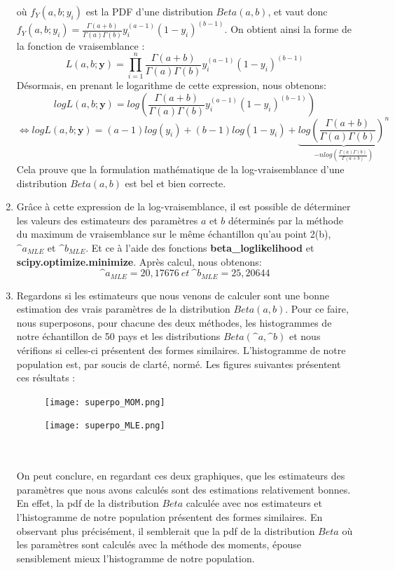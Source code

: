 \documentclass[a4paper, 11pt]{article}
\begin{document}
\begin{enumerate}[label=(\alph*)]
    où $f_Y(a,b;y_i)$ est la PDF d'une distribution $Beta(a,b)$, et vaut donc $f_Y(a,b;y_i)=\frac{\Gamma(a+b)}{\Gamma(a) \Gamma(b)} y_i^{(a-1)} (1-y_i)^{(b-1)}$.
    On obtient ainsi la forme de la fonction de vraisemblance :
    $$L(a,b;\textbf{y})=\prod^n_{i=1} \frac{\Gamma(a+b)}{\Gamma(a) \Gamma(b)} y_i^{(a-1)} (1-y_i)^{(b-1)}$$
    Désormais, en prenant le logarithme de cette expression, nous obtenons:
    $$log L(a,b;\textbf{y})=log\left(\frac{\Gamma(a+b)}{\Gamma(a) \Gamma(b)} y_i^{(a-1)} (1-y_i)^{(b-1)}\right)$$
    $$\Longleftrightarrow log L(a,b;\textbf{y})=(a-1)log(y_i)+(b-1) log(1-y_i)+\underbrace{log\left(\frac{\Gamma(a+b)}{\Gamma(a) \Gamma(b)}\right)^n}_{-nlog\left(\frac{\Gamma(a) \Gamma(b)}{\Gamma (a+b)}\right)}$$
    Cela prouve que la formulation mathématique de la log-vraisemblance d'une distribution $Beta(a,b)$ est bel et bien correcte.
    \item Grâce à cette expression de la log-vraisemblance, il est possible de déterminer les valeurs des estimateurs des paramètres $a$ et $b$ déterminés par la méthode du maximum de vraisemblance sur le même échantillon qu'au point 2(b), $\^a_{MLE}$ et $\^b_{MLE}$. Et ce à l'aide des fonctions \textbf{beta\_loglikelihood} et \textbf{scipy.optimize.minimize}. Après calcul, nous obtenons:
    $$\^a_{MLE}=20,17676~et~\^b_{MLE}=25,20644$$
    \item Regardons si les estimateurs que nous venons de calculer sont une bonne estimation des vrais paramètres de la distribution $Beta(a,b)$. Pour ce faire, nous superposons, pour chacune des deux méthodes, les histogrammes de notre échantillon de 50 pays et les distributions $Beta(\^a,\^b)$ et nous vérifions si celles-ci présentent des formes similaires. L'histogramme de notre population est, par soucis de clarté, normé. Les figures suivantes présentent ces résultats :
        \begin{figure}[h!]
    \begin{minipage}{.5\textwidth}
        \centering
        \texttt{[image: superpo\_MOM.png]}
        \caption{}
        \label{Débit_frottement}
    \end{minipage}
    \hspace{0.55cm}
    \begin{minipage}{.5\textwidth}
        \centering
        \texttt{[image: superpo\_MLE.png]}
        \caption{}
        \label{Pression_frottement}
    \end{minipage}
\end{figure}\\\\
On peut conclure, en regardant ces deux graphiques, que les estimateurs des paramètres que nous avons calculés sont des estimations relativement bonnes. En effet, la pdf de la distribution $Beta$ calculée avec nos estimateurs et l'histogramme de notre population présentent des formes similaires. En observant plus précisément, il semblerait que la pdf de la distribution $Beta$ où les paramètres sont calculés avec la méthode des moments, épouse sensiblement mieux l'histogramme de notre population.


\end{enumerate}
\end{document}

